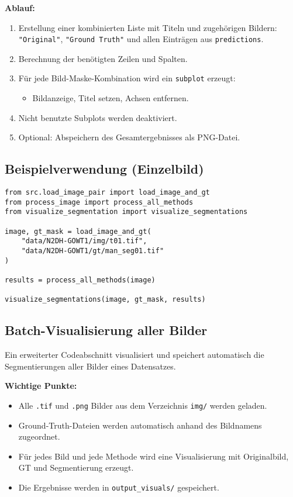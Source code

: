 \documentclass[a4paper,12pt]{article}
\begin{document}
\textbf{Ablauf:}
\begin{enumerate}
  \item Erstellung einer kombinierten Liste mit Titeln und zugehörigen Bildern: \texttt{"Original"}, \texttt{"Ground Truth"} und allen Einträgen aus \texttt{predictions}.
  \item Berechnung der benötigten Zeilen und Spalten.
  \item Für jede Bild-Maske-Kombination wird ein \texttt{subplot} erzeugt:
  \begin{itemize}
    \item Bildanzeige, Titel setzen, Achsen entfernen.
  \end{itemize}
  \item Nicht benutzte Subplots werden deaktiviert.
  \item Optional: Abspeichern des Gesamtergebnisses als PNG-Datei.
\end{enumerate}

\subsection*{ Beispielverwendung (Einzelbild)}

\begin{verbatim}
from src.load_image_pair import load_image_and_gt
from process_image import process_all_methods
from visualize_segmentation import visualize_segmentations

image, gt_mask = load_image_and_gt(
    "data/N2DH-GOWT1/img/t01.tif",
    "data/N2DH-GOWT1/gt/man_seg01.tif"
)

results = process_all_methods(image)

visualize_segmentations(image, gt_mask, results)
\end{verbatim}

\subsection*{ Batch-Visualisierung aller Bilder}

Ein erweiterter Codeabschnitt visualisiert und speichert automatisch die Segmentierungen aller Bilder eines Datensatzes.

\textbf{Wichtige Punkte:}
\begin{itemize}
  \item Alle \texttt{.tif} und \texttt{.png} Bilder aus dem Verzeichnis \texttt{img/} werden geladen.
  \item Ground-Truth-Dateien werden automatisch anhand des Bildnamens zugeordnet.
  \item Für jedes Bild und jede Methode wird eine Visualisierung mit Originalbild, GT und Segmentierung erzeugt.
  \item Die Ergebnisse werden in \texttt{output\_visuals/} gespeichert.
\end{itemize}
\end{document}
